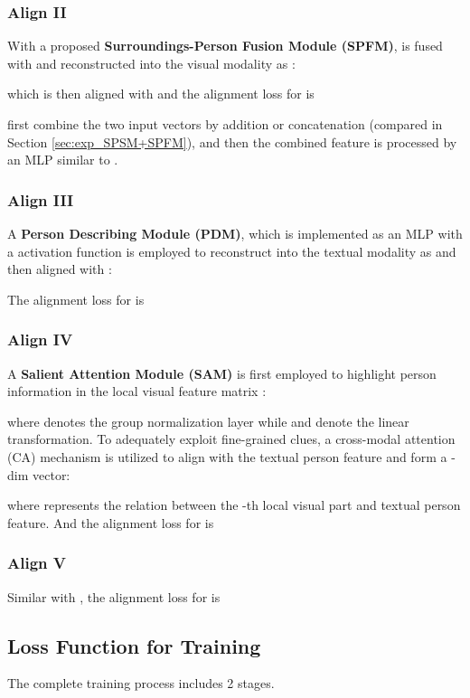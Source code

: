 \documentclass[sigconf]{acmart}
\begin{document}
\subsubsection{Align II}
With a proposed \textbf{Surroundings-Person Fusion Module (SPFM)},  is fused with  and reconstructed into the visual modality as :

which is then aligned with  and the alignment loss for  is

 first combine the two input vectors by addition or concatenation (compared in Section \ref{sec:exp_SPSM+SPFM}), and then the combined feature is processed by an MLP similar to .

\subsubsection{Align III}
A \textbf{Person Describing Module (PDM)}, which is implemented as an MLP with a  activation function is employed to reconstruct  into the textual modality as  and then aligned with :

The alignment loss for  is


\subsubsection{Align IV}
A \textbf{Salient Attention Module (SAM)} is first employed to highlight person information in the local visual feature matrix :

where  denotes the group normalization layer while  and  denote the linear transformation. To adequately exploit fine-grained clues, a cross-modal attention (CA) mechanism \cite{niu2020improving, wang2020img} is utilized to align  with the textual person feature  and form a -dim vector:

where  represents the relation between the -th local visual part and textual person feature. And the alignment loss for  is


\subsubsection{Align V}
Similar with , the alignment loss for  is



\subsection{Loss Function for Training}
\label{sec:loss}
The complete training process includes 2 stages.
\end{document}
